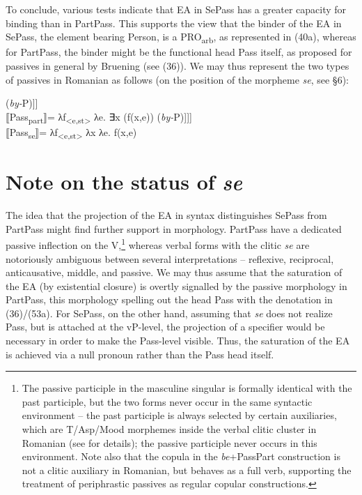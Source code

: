 \documentclass[output=paper]{langsci/langscibook}
\begin{document}
To conclude, various tests indicate that EA in SePass has a greater capacity for binding than in PartPass. This supports the view that the binder of the EA in SePass, the element bearing Person, is a PRO\textsubscript{arb}, as represented in (40a), whereas for PartPass, the binder might be the functional head Pass itself, as proposed for passives in general by Bruening (see (36)). We may thus represent the two types of passives in Romanian as follows (on the position of the morpheme \textit{se}, see §6):

\ea%
    \label{ex:giurgea:53}
    \ea\relax [\textsubscript{PassPartP} Pass\textsubscript{Part} [\textit{\textsubscript{v}}\textsubscript{P} \textit{v} [\textsubscript{VP} V IA] (\textit{by-}P)]]\\⟦Pass\textsubscript{part}⟧= λf\textsubscript{<e,st>} λe. ∃x (f(x,e))
    \ex\relax [\textsubscript{PassSeP} PRO\textsubscript{arb} [Pass\textsubscript{se} [\textit{\textsubscript{v}}\textsubscript{P} \textit{v} [\textsubscript{VP} V IA] (\textit{by-}P)]]]\\⟦Pass\textsubscript{se}⟧=  λf\textsubscript{<e,st>} λx λe. f(x,e) 
    \z
\z

\section{Note on the status of \textit{se}}%
The idea that the projection of the EA in syntax distinguishes SePass from PartPass might find further support in morphology. PartPass have a dedicated passive inflection on the V,\footnote{The passive participle in the masculine singular is formally identical with the past participle, but the two forms never occur in the same syntactic environment – the past participle is always selected by certain auxiliaries, which are T/Asp/Mood morphemes inside the verbal clitic cluster in Romanian (see \citet{Dobrovie-Sorin1994} for details); the passive participle never occurs in this environment. Note also that the copula in the \textit{be}+PassPart construction is not a clitic auxiliary in Romanian, but behaves as a full verb, supporting the treatment of periphrastic passives as regular copular constructions.}  whereas verbal forms with the clitic \textit{se} are notoriously ambiguous between several interpretations – reflexive, reciprocal, anticausative, middle, and passive. We may thus assume that the saturation of the EA (by existential closure) is overtly signalled by the passive morphology in PartPass, this morphology spelling out the head Pass with the denotation in (36)/(53a). For SePass, on the other hand, assuming that \textit{se} does not realize Pass, but is attached at the vP-level, the projection of a specifier would be necessary in order to make the Pass-level visible. Thus, the saturation of the EA is achieved via a null pronoun rather than the Pass head itself.
\end{document}

